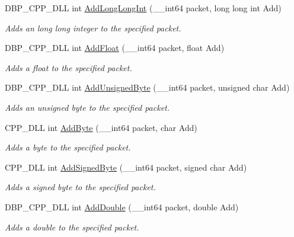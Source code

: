 \begin{DoxyCompactItemize}
DBP\_\-CPP\_\-DLL int \hyperlink{namespacemn_a13d6eed8b77ec2dda29e05439e74a362}{AddLongLongInt} (\_\-\_\-int64 packet, long long int Add)
\begin{DoxyCompactList}\small\item\em Adds an long long integer to the specified packet. \item\end{DoxyCompactList}\item 
DBP\_\-CPP\_\-DLL int \hyperlink{namespacemn_a5a2b8af8c6c80b9426179184af910cc5}{AddFloat} (\_\-\_\-int64 packet, float Add)
\begin{DoxyCompactList}\small\item\em Adds a float to the specified packet. \item\end{DoxyCompactList}\item 
DBP\_\-CPP\_\-DLL int \hyperlink{namespacemn_a567b66268ff1f61419d14a0bccb00ccc}{AddUnsignedByte} (\_\-\_\-int64 packet, unsigned char Add)
\begin{DoxyCompactList}\small\item\em Adds an unsigned byte to the specified packet. \item\end{DoxyCompactList}\item 
CPP\_\-DLL int \hyperlink{namespacemn_a05539f2bdb0fb27245b5ab8b997391e7}{AddByte} (\_\-\_\-int64 packet, char Add)
\begin{DoxyCompactList}\small\item\em Adds a byte to the specified packet. \item\end{DoxyCompactList}\item 
CPP\_\-DLL int \hyperlink{namespacemn_aadfe7586ddbb5a7db38a1039305bbfdd}{AddSignedByte} (\_\-\_\-int64 packet, signed char Add)
\begin{DoxyCompactList}\small\item\em Adds a signed byte to the specified packet. \item\end{DoxyCompactList}\item 
DBP\_\-CPP\_\-DLL int \hyperlink{namespacemn_ad372ea8cead9fcb5a917c5ec2b71d0f3}{AddDouble} (\_\-\_\-int64 packet, double Add)
\begin{DoxyCompactList}\small\item\em Adds a double to the specified packet. \item\end{DoxyCompactList}\item 

\end{DoxyCompactItemize}
